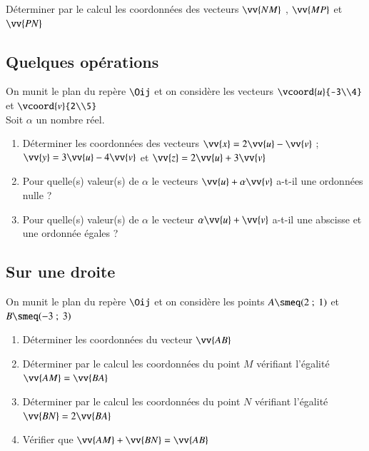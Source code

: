 \documentclass[oneside,12pt]{article}          %
\begin{document}
Déterminer par le calcul les coordonnées des vecteurs $\vv{NM}$ , $\vv{MP}$ et $\vv{PN}$



\subsection{Quelques opérations}
On munit le plan du repère $\Oij$ et on considère les vecteurs $\vcoord{u}{-3\\4}$ et $\vcoord{v}{2\\5}$\\
Soit $\alpha$ un nombre réel.
\begin{enumerate}
	\item Déterminer les coordonnées des vecteurs $\vv{x}=2\vv{u}-\vv{v}$ \quad ; \quad $\vv{y}=3\vv{u}-4\vv{v}$ \quad et \quad $\vv{z}=2\vv{u}+3\vv{v}$
	\item Pour quelle(s) valeur(s) de $\alpha$ le vecteurs $\vv{u}+\alpha\vv{v}$ a-t-il une ordonnées nulle ?
	\item Pour quelle(s) valeur(s) de $\alpha$ le vecteur $\alpha\vv{u}+\vv{v}$ a-t-il une abscisse et une ordonnée égales ? 
\end{enumerate}



\subsection{Sur une droite}
On munit le plan du repère $\Oij$ et on considère les points $A\smeq(2~;~1)$ et $B\smeq(-3~;~3)$
\begin{enumerate}
	\item Déterminer les coordonnées du vecteur $\vv{AB}$
	\item Déterminer par le calcul les coordonnées du point $M$ vérifiant l'égalité $\vv{AM}=\vv{BA}$
	\item Déterminer par le calcul les coordonnées du point $N$ vérifiant l'égalité $\vv{BN}=2\vv{BA}$
	\item Vérifier que $\vv{AM}+\vv{BN}=\vv{AB}$
\end{enumerate}
\end{document}
